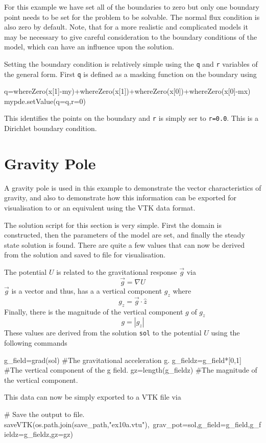 For this example we have set all of the boundaries to zero but only one boundary
point needs to be set for the problem to be solvable. The normal flux condition
is also zero by default. Note, that for a more realistic and complicated models
it may be necessary to give careful consideration to the boundary conditions of the model,
which can have an influence upon the solution.

Setting the boundary condition is relatively simple using the \verb!q! and
\verb!r! variables of the general form. First \verb!q! is defined as a masking
function on the boundary using
\begin{python}
q=whereZero(x[1]-my)+whereZero(x[1])+whereZero(x[0])+whereZero(x[0]-mx)
mypde.setValue(q=q,r=0)
\end{python}
This identifies the points on the boundary and \verb!r! is simply
ser to \verb!r=0.0!. This is a Dirichlet boundary condition.

\clearpage
\section{Gravity Pole}
A gravity pole is used in this example to demonstrate the vector characteristics
of gravity, and also to demonstrate how this information can be exported for
visualisation to \mayavi or an equivalent using the VTK data format.

The solution script for this section is very simple. First the domain is
constructed, then the parameters of the model are set, and finally the steady
state solution is found. There are quite a few values that can now be derived
from the solution and saved to file for visualisation.

The potential $U$ is related to the gravitational response $\vec{g}$ via
\begin{equation}
\vec{g} = \nabla U
\end{equation}
$\vec{g}$ is a vector and thus, has a a vertical component $g_{z}$ where
\begin{equation}
g_{z}=\vec{g}\cdot\hat{z}
\end{equation}
Finally, there is the magnitude of the vertical component $g$ of
$g_{z}$
\begin{equation}
g=|g_{z}|
\end{equation}
These values are derived from the \esc solution \verb!sol! to the potential $U$
using the following commands
\begin{python}
g_field=grad(sol) #The gravitational acceleration g.
g_fieldz=g_field*[0,1] #The vertical component of the g field.
gz=length(g_fieldz) #The magnitude of the vertical component.
\end{python}
This data can now be simply exported to a VTK file via
\begin{python}
# Save the output to file.
saveVTK(os.path.join(save_path,"ex10a.vtu"),\
        grav_pot=sol,g_field=g_field,g_fieldz=g_fieldz,gz=gz)
\end{python}

